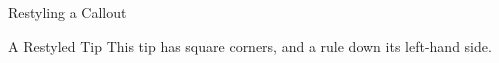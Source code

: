 \begin{ExampleBlock}{Restyling a Callout}

\begin{RpgTip}{A Restyled Tip}
    This tip has square corners, and a rule down its left-hand side.
\end{RpgTip}


\end{ExampleBlock}
